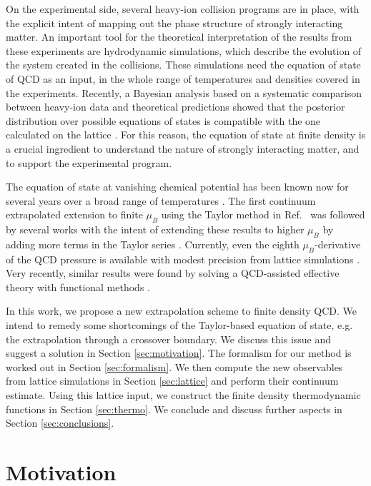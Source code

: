 \documentclass[aps,prd,twocolumn,superscriptaddress]{revtex4-2}
\begin{document}
On the experimental side, several heavy-ion collision 
programs are in place, with the explicit intent of 
mapping out the phase structure of strongly 
interacting matter. An important tool for the 
theoretical interpretation of the results from
these experiments are hydrodynamic 
simulations, which describe the evolution of the system created in the collisions. These simulations need the equation of state of QCD as an input, in the whole range of temperatures and densities covered in the experiments. Recently, a Bayesian analysis based on a systematic comparison between heavy-ion data and theoretical predictions showed that the posterior distribution over possible equations of states is compatible with the one calculated on the lattice \cite{Pratt:2015zsa}. For this reason, the equation of state at finite density is a crucial ingredient to understand the nature of strongly interacting matter, and to support the experimental program.


The equation of state at vanishing chemical potential 
has been known now for several years over a broad range of temperatures
\cite{Borsanyi:2010cj,Borsanyi:2013bia,Bazavov:2014pvz}.
The first continuum extrapolated extension to finite $\mu_B$ using
the Taylor method in Ref.~\cite{Borsanyi:2012cr} was followed by
several works with the intent of extending these results to higher $\mu_B$ by adding more terms in the Taylor series
\cite{Bazavov:2017dus,Gunther:2016vcp}. Currently, even the eighth
$\mu_B$-derivative of the QCD pressure is available with modest precision
from lattice simulations \cite{Borsanyi:2018grb,Bazavov:2020bjn}.  Very
recently, similar results were found by solving a QCD-assisted effective theory
with functional methods \cite{Fu:2021oaw}.

In this work, we propose a new extrapolation scheme to finite density QCD.
We intend to remedy some shortcomings of the Taylor-based
equation of state, e.g. the extrapolation through a crossover boundary.
We discuss this issue and suggest a solution in Section \ref{sec:motivation}.
The formalism for our method is worked out in Section
\ref{sec:formalism}. We then compute the new observables from
lattice simulations in Section \ref{sec:lattice} and perform their continuum
estimate. Using this lattice input, we construct the finite density
thermodynamic functions in Section \ref{sec:thermo}. We conclude and
discuss further aspects in Section \ref{sec:conclusions}.


\section{Motivation\label{sec:motivation}}
\end{document}
